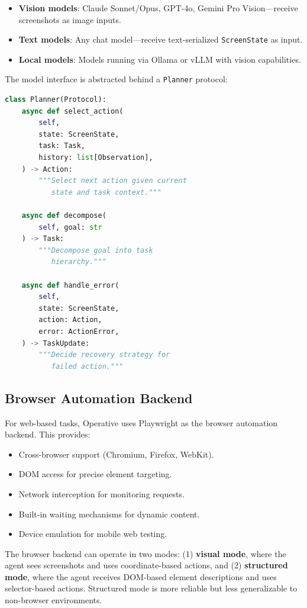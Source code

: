 \begin{itemize}[leftmargin=*]
    \item \textbf{Vision models}: Claude Sonnet/Opus, GPT-4o, Gemini Pro Vision---receive screenshots as image inputs.
    \item \textbf{Text models}: Any chat model---receive text-serialized \texttt{ScreenState} as input.
    \item \textbf{Local models}: Models running via Ollama or vLLM with vision capabilities.
\end{itemize}

The model interface is abstracted behind a \texttt{Planner} protocol:

\begin{lstlisting}[language=Python, caption=Planner protocol]
class Planner(Protocol):
    async def select_action(
        self,
        state: ScreenState,
        task: Task,
        history: list[Observation],
    ) -> Action:
        """Select next action given current
           state and task context."""

    async def decompose(
        self, goal: str
    ) -> Task:
        """Decompose goal into task
           hierarchy."""

    async def handle_error(
        self,
        state: ScreenState,
        action: Action,
        error: ActionError,
    ) -> TaskUpdate:
        """Decide recovery strategy for
           failed action."""
\end{lstlisting}

\subsection{Browser Automation Backend}

For web-based tasks, Operative uses Playwright as the browser automation backend. This provides:

\begin{itemize}[leftmargin=*]
    \item Cross-browser support (Chromium, Firefox, WebKit).
    \item DOM access for precise element targeting.
    \item Network interception for monitoring requests.
    \item Built-in waiting mechanisms for dynamic content.
    \item Device emulation for mobile web testing.
\end{itemize}

The browser backend can operate in two modes: (1) \textbf{visual mode}, where the agent sees screenshots and uses coordinate-based actions, and (2) \textbf{structured mode}, where the agent receives DOM-based element descriptions and uses selector-based actions. Structured mode is more reliable but less generalizable to non-browser environments.

